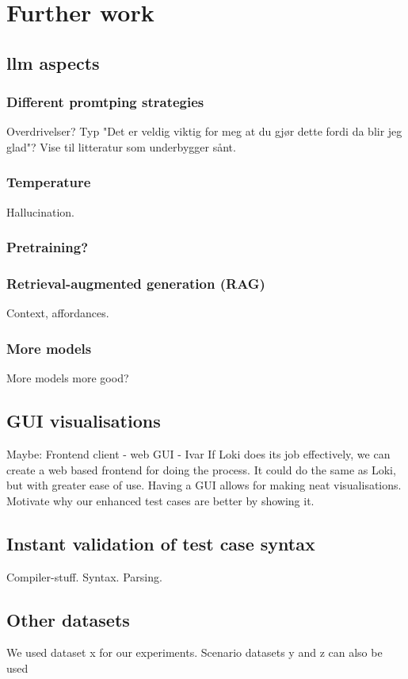 \chapter{Further work}

\section{\acrshort{llm} aspects}

\subsection{Different promtping strategies}

Overdrivelser? Typ "Det er veldig viktig for meg at du gjør dette fordi da blir
jeg glad"? Vise til litteratur som underbygger sånt.

\subsection{Temperature}
Hallucination.

\subsection{Pretraining?}

\subsection{Retrieval-augmented generation (RAG)}
Context, affordances.

\subsection{More models}

More models more good?

\section{GUI visualisations}

Maybe: Frontend client - web GUI - Ivar
If Loki does its job effectively, we can create a web based frontend for doing the process. It could do the same as Loki, but with greater ease of use.
Having a GUI allows for making neat visualisations.
Motivate why our enhanced test cases are better by showing it.

\section{Instant validation of test case syntax}
Compiler-stuff. Syntax. Parsing.


\section{Other datasets}

We used dataset x for our experiments. Scenario datasets y and z can also be used
